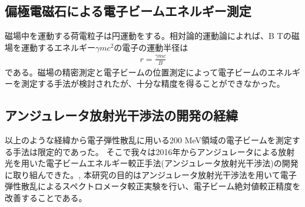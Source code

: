\documentclass[a4paper,11pt,uplatex]{jsbook}
\begin{document}
\subsection{偏極電磁石による電子ビームエネルギー測定}
磁場中を運動する荷電粒子は円運動をする。相対論的運動論によれば、B Tの磁場を運動するエネルギー$\gamma mc^2$の電子の運動半径は
\begin{eqnarray}
  r = \frac{\gamma mc}{B}
\end{eqnarray}
である。磁場の精密測定と電子ビームの位置測定によって電子ビームのエネルギーを測定する手法が検討されたが、十分な精度を得ることができなかった。
\subsection{アンジュレータ放射光干渉法の開発の経緯}
以上のような経緯から電子弾性散乱に用いる200 MeV領域の電子ビームを測定する手法は限定的であった。
そこで我々は2016年からアンジュレータによる放射光を用いた電子ビームエネルギー較正手法(アンジュレータ放射光干渉法)の開発に取り組んできた。\cite{klag2018},\cite{klag2023}
本研究の目的はアンジュレータ放射光干渉法を用いて電子弾性散乱によるスペクトロメータ較正実験を行い、電子ビーム絶対値較正精度を改善することである。
\end{document}
